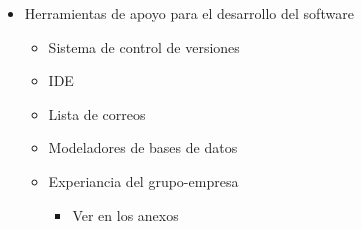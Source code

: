 \documentclass[12pt]{article}
\numberwithin{equation}{section}
\numberwithin{figure}{section}
\numberwithin{table}{section}
\begin{document}
\begin{itemize}
\item Herramientas de apoyo para el desarrollo del software
\begin{itemize}
\item Sistema de control de versiones
\item IDE 
\item Lista de correos 
\item Modeladores de bases de datos
\end{itemize} 

\begin{itemize}
\item Experiancia del grupo-empresa
\begin{itemize}
\item Ver en los anexos
\end{itemize} 
\end{itemize}

\end{itemize}



\end{document}
